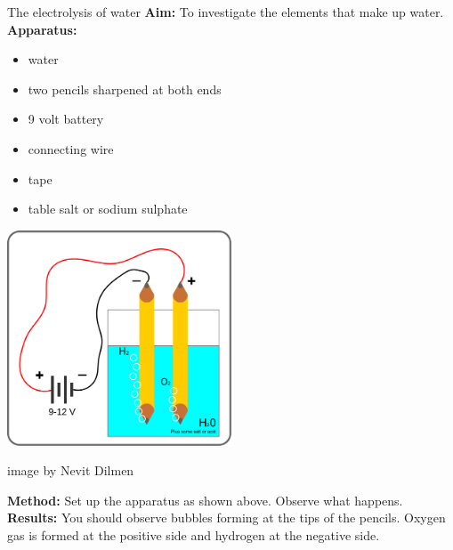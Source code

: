 \begin{g_experiment}{The electrolysis of water}
\textbf{Aim: } To investigate the elements that make up water.\\
\textbf{Apparatus:}\\
\begin{minipage}{.4\textwidth}
\begin{itemize}[noitemsep]
 \item water
\item two pencils sharpened at both ends
\item 9 volt battery
\item connecting wire
\item tape
\item table salt or sodium sulphate
\end{itemize}
\end{minipage}
\begin{minipage}{.6\textwidth} 
\begin{center}
   \includegraphics[width=0.5\textwidth]{photos/electrolysis.png}\\
\begin{caption}image by Nevit Dilmen\end{caption}
\end{center}
\end{minipage} \nopagebreak
\textbf{Method: } Set up the apparatus as shown above. Observe what happens.\\
\textbf{Results: } You should observe bubbles forming at the tips of the pencils. Oxygen gas is formed at the positive side and hydrogen at the negative side. 
\end{g_experiment}
            \nopagebreak
